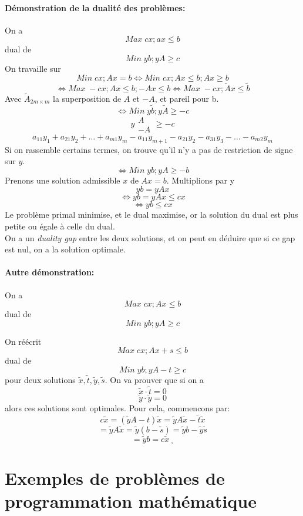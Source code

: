 \documentclass[a4paper]{report}
\begin{document}
\paragraph{Démonstration de la dualité des problèmes:}
On a
\[Max\;cx; ax\le b\]
dual de
\[Min\;yb;yA\ge c\]
On travaille sur
\[Min\;cx; Ax=b\Leftrightarrow Min\;cx; Ax\le b;Ax\ge b\]
\[\Leftrightarrow Max\;-cx; Ax\le b;-Ax\le b\Leftrightarrow Max\;-cx; \tilde
Ax\le \tilde b\] Avec \(\tilde A_{2m\times m}\) la superposition de \(A\) et
\(-A\), et pareil pour b.
\[\Leftrightarrow Min\;y\tilde b;y\tilde A\ge -c\]
\[y\begin{matrix}A\\-A\end{matrix}\ge -c\]
\[a_{11}y_{1}+a_{21}y_2+\dots+a_{m1}y_m-a_{11}y_{m+1}-a_{21}y_2-a_{31}y_3-\dots-a_{m2}y_m\]
Si on rassemble certains termes, on trouve qu'il n'y a pas de restriction de
signe sur \(y\).
\[\Leftrightarrow Min\;yb;yA\ge -b\]
Prenons une solution admissible \(x\) de \(Ax=b\).
Multiplions par y
\[yb=yAx\]
\[\Leftrightarrow yb=yAx\le cx\]
\[\Leftrightarrow yb\le cx\]
Le problème primal minimise, et le dual maximise, or la solution du dual est
plus petite ou égale à celle du dual.\\
On a un \emph{duality gap} entre les deux solutions, et on peut en déduire que
si ce gap est nul, on a la solution optimale.
\paragraph{Autre démonstration:}
On a
\[Max\;cx; Ax\le b\]
dual de
\[Min\;yb;yA\ge c\]

On réécrit
\[Max\;cx; Ax+s\le b\]
dual de
\[Min\;yb;yA-t\ge c\]
pour deux solutions \(\tilde x, \tilde t, \tilde y, \tilde s\).
On va prouver que si on a
\[\tilde x\cdot\tilde t=0\]
\[\tilde y\cdot\tilde y=0\]
alors ces solutions sont optimales.
Pour cela, commencons par:
\[c\tilde x=(\tilde yA-t)\tilde x=\tilde yA\tilde x-\tilde t\tilde x\]
\[=\tilde yA\tilde x=\tilde y(b-\tilde s)=\tilde yb-\tilde y\tilde s\]
\[=\tilde yb=c\tilde x\;_{\square}\]

\section{Exemples de problèmes de programmation mathématique}
\end{document}
